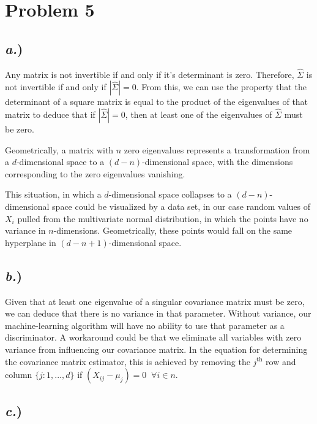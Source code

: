 \documentclass{report}
\begin{document}
\newpage
\section*{Problem 5}

\subsection*{\textit{a.})}

Any matrix is not invertible if and only if it's determinant is zero. Therefore, $\hat{\Sigma}$ is not invertible if and only if $|\hat{\Sigma}| = 0$. From this, we can use the property that the determinant of a square matrix is equal to the product of the eigenvalues of that matrix to deduce that if $|\hat{\Sigma}| = 0$, then at least one of the eigenvalues of $\hat{\Sigma}$ must be zero. 

Geometrically, a matrix with $n$ zero eigenvalues represents a transformation from a $d$-dimensional space to a $(d-n)$-dimensional space, with the dimensions corresponding to the zero eigenvalues vanishing.

This situation, in which a $d$-dimensional space collapses to a $(d-n)$-dimensional space could be visualized by a data set, in our case random values of $X_i$ pulled from the multivariate normal distribution, in which the points have no variance in $n$-dimensions. Geometrically, these points would fall on the same hyperplane in $(d-n+1)$-dimensional space.


\subsection*{\textit{b.})}

Given that at least one eigenvalue of a singular covariance matrix must be zero, we can deduce that there is no variance in that parameter. Without variance, our machine-learning algorithm will have no ability to use that parameter as a discriminator. A workaround could be that we eliminate all variables with zero variance from influencing our covariance matrix. In the equation for determining the covariance matrix estimator, this is achieved by removing the $j^{\text{th}}$ row and column $\{j:1,...,d\}$ if $(X_{ij} - \mu_j ) =0 \;\; \forall i \in n$. 


\subsection*{\textit{c.})}
\end{document}
